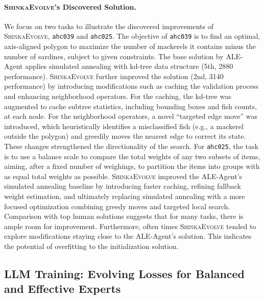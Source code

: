 \documentclass[11pt, a4paper]{include/gdm_format}
\newcommand{\ouralgo}{\textsc{ShinkaEvolve}\xspace}
\begin{document}
\paragraph{\ouralgo's Discovered Solution.}
We focus on two tasks to illustrate the discovered improvements of \ouralgo, \texttt{ahc039} and \texttt{ahc025}.
The objective of \texttt{ahc039} is to find an optimal, axis-aligned polygon to maximize the number of mackerels it contains minus the number of sardines, subject to given constraints. The base solution by ALE-Agent applies simulated annealing with kd-tree data structure (5th, 2880 performance). \ouralgo further improved the solution (2nd, 3140 performance) by introducing modifications such as caching the validation process and enhancing neighborhood operators. For the caching, the kd-tree was augmented to cache subtree statistics, including bounding boxes and fish counts, at each node. For the neighborhood operators, a novel ``targeted edge move'' was introduced, which heuristically identifies a misclassified fish (e.g., a mackerel outside the polygon) and greedily moves the nearest edge to correct its state. These changes strengthened the directionality of the search.
For \texttt{ahc025}, the task is to use a balance scale to compare the total weights of any two subsets of items, aiming, after a fixed number of weighings, to partition the items into groups with as equal total weights as possible. \ouralgo improved the ALE-Agent's simulated annealing baseline by introducing faster caching, refining fallback weight estimation, and ultimately replacing simulated annealing with a more focused optimization combining greedy moves and targeted local search. Comparison with top human solutions suggests that for many tasks, there is ample room for improvement. Furthermore, often times \ouralgo tended to explore modifications staying close to the ALE-Agent's solution. This indicates the potential of overfitting to the initialization solution.


\newpage
\subsection{LLM Training: Evolving Losses for Balanced and Effective Experts}
\end{document}
